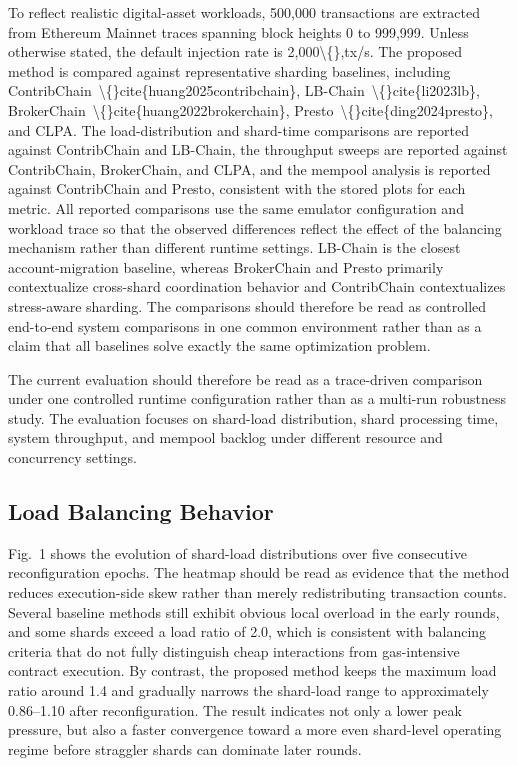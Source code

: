 \documentclass{article}
\begin{document}
To reflect realistic digital-asset workloads, 500,000 transactions are extracted from Ethereum Mainnet traces spanning block heights 0 to 999,999. Unless otherwise stated, the default injection rate is 2,000\textbackslash\{\},tx/s. The proposed method is compared against representative sharding baselines, including ContribChain~\textbackslash\{\}cite\{huang2025contribchain\}, LB-Chain~\textbackslash\{\}cite\{li2023lb\}, BrokerChain~\textbackslash\{\}cite\{huang2022brokerchain\}, Presto~\textbackslash\{\}cite\{ding2024presto\}, and CLPA. The load-distribution and shard-time comparisons are reported against ContribChain and LB-Chain, the throughput sweeps are reported against ContribChain, BrokerChain, and CLPA, and the mempool analysis is reported against ContribChain and Presto, consistent with the stored plots for each metric. All reported comparisons use the same emulator configuration and workload trace so that the observed differences reflect the effect of the balancing mechanism rather than different runtime settings. LB-Chain is the closest account-migration baseline, whereas BrokerChain and Presto primarily contextualize cross-shard coordination behavior and ContribChain contextualizes stress-aware sharding. The comparisons should therefore be read as controlled end-to-end system comparisons in one common environment rather than as a claim that all baselines solve exactly the same optimization problem.

The current evaluation should therefore be read as a trace-driven comparison under one controlled runtime configuration rather than as a multi-run robustness study.
The evaluation focuses on shard-load distribution, shard processing time, system throughput, and mempool backlog under different resource and concurrency settings.

\subsection{Load Balancing Behavior}\label{sec:load-balancing-behavior}

Fig.~1 shows the evolution of shard-load distributions over five consecutive reconfiguration epochs. The heatmap should be read as evidence that the method reduces execution-side skew rather than merely redistributing transaction counts. Several baseline methods still exhibit obvious local overload in the early rounds, and some shards exceed a load ratio of 2.0, which is consistent with balancing criteria that do not fully distinguish cheap interactions from gas-intensive contract execution. By contrast, the proposed method keeps the maximum load ratio around 1.4 and gradually narrows the shard-load range to approximately 0.86--1.10 after reconfiguration. The result indicates not only a lower peak pressure, but also a faster convergence toward a more even shard-level operating regime before straggler shards can dominate later rounds.
\end{document}
